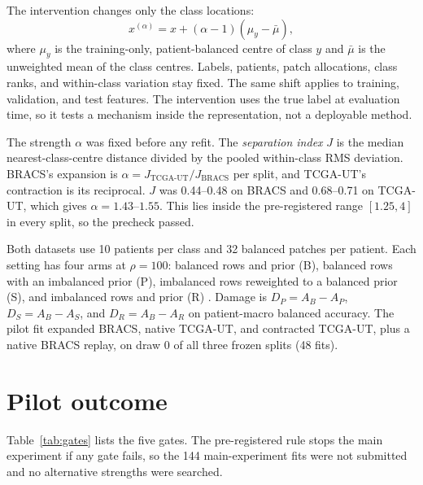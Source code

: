 \documentclass[11pt]{article}
\begin{document}
The intervention changes only the class locations:
\begin{equation}
  x^{(\alpha)} = x + (\alpha - 1)\left(\mu_y - \bar\mu\right),
  \label{eq:intervention}
\end{equation}
\noindent where $\mu_y$ is the training-only, patient-balanced centre of class $y$ and $\bar\mu$ is the unweighted mean of the class centres. Labels, patients, patch allocations, class ranks, and within-class variation stay fixed. The same shift applies to training, validation, and test features. The intervention uses the true label at evaluation time, so it tests a mechanism inside the representation, not a deployable method.

The strength $\alpha$ was fixed before any refit. The \emph{separation index} $J$ is the median nearest-class-centre distance divided by the pooled within-class RMS deviation. BRACS's expansion is $\alpha = J_{\text{TCGA-UT}}/J_{\text{BRACS}}$ per split, and TCGA-UT's contraction is its reciprocal. $J$ was 0.44--0.48 on BRACS and 0.68--0.71 on TCGA-UT, which gives $\alpha = 1.43$--$1.55$. This lies inside the pre-registered range $[1.25, 4]$ in every split, so the precheck passed.

Both datasets use 10 patients per class and 32 balanced patches per patient. Each setting has four arms at $\rho=100$: balanced rows and prior (B), balanced rows with an imbalanced prior (P), imbalanced rows reweighted to a balanced prior (S), and imbalanced rows and prior (R) \citep{queisler2026causeTcga, queisler2026causeBracs}. Damage is $D_P = A_B - A_P$, $D_S = A_B - A_S$, and $D_R = A_B - A_R$ on patient-macro balanced accuracy. The pilot fit expanded BRACS, native TCGA-UT, and contracted TCGA-UT, plus a native BRACS replay, on draw 0 of all three frozen splits (48 fits).

\section{Pilot outcome}
\label{sec:results}
Table~\ref{tab:gates} lists the five gates. The pre-registered rule stops the main experiment if any gate fails, so the 144 main-experiment fits were not submitted and no alternative strengths were searched.
\end{document}
